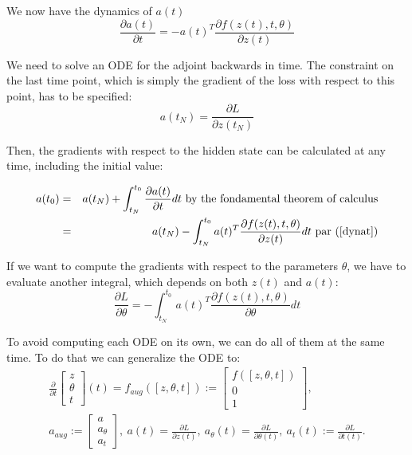 \documentclass[10pt,a4paper]{article}
\theoremstyle{definition}
\theoremstyle{definition}
\theoremstyle{definition}
\begin{document}
We now have the dynamics of $a(t)$
\begin{equation}
\label{dynat}
\frac{\partial a(t)}{\partial t} = -a(t)^T\frac{\partial f(z(t),t,\theta)} {\partial z(t)}
\end{equation}
 
We need to solve an ODE for the adjoint backwards in time. The constraint on the last time point, which is simply the gradient of the loss with respect to this point, has to be specified:
\begin{equation*}
a(t_N) = \frac{\partial L}{\partial z(t_N)}
\end{equation*}

Then, the gradients with respect to the hidden state can be calculated at any time, including the initial value:

\begin{eqnarray*}
a(t_0) &=& a(t_N) + \int^{t_0}_{t_N} \frac{\partial a(t)}{\partial t} dt \text{ by the fondamental theorem of calculus}\\
	   &=& a(t_N) - \int^{t_0}_{t_N} a(t)^T \frac{\partial f(z(t),t,\theta)} {\partial z(t)} dt \text{ par (\ref{dynat})}
\end{eqnarray*}


If we want to compute the gradients with respect to the parameters $\theta$, we have to evaluate another integral, which depends on both $z(t)$ and $a(t)$:
\begin{equation}
\label{devtheta}
\frac{\partial L}{\partial \theta} = - \int^{t_0}_{t_N} a(t)^T \frac{\partial f(z(t),t,\theta)} {\partial \theta} dt
\end{equation}


To avoid computing each ODE on its own, we can do all of them at the same time. To do that we can generalize the ODE to:
\begin{eqnarray*}
\frac{\partial}{\partial t} \begin{bmatrix}
							z \\ \theta \\ t
							\end{bmatrix} (t) 
= f_{aug}([z,\theta ,t]) := \begin{bmatrix}
							f([z,\theta ,t]) \\ 0 \\ 1
							\end{bmatrix}, \\
a_{aug} := \begin{bmatrix}
			a \\ a_{\theta} \\ a_t
			\end{bmatrix}, \ 
a(t) = \frac{\partial L}{\partial z(t)}, \ 
a_\theta (t) = \frac{\partial L}{\partial \theta (t)}, \ 
a_t(t) := \frac{\partial L}{\partial t(t)}.
\end{eqnarray*}
\end{document}

